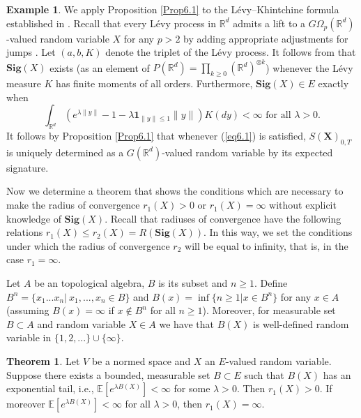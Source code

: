 \documentclass[12pt,a4paper]{report}
\theoremstyle{definition}
\newtheorem{theorem}{Theorem}
\newtheorem{example}{Example}
\begin{document}
\begin{example}\parencite[see][Example 6.2]{chevyrev2016characteristic}
	We apply Proposition \ref{Prop6.1} to the Lévy–Khintchine formula established	in \parencite{friz2017general}. Recall that every Lévy process in $\mathbb{R}^d$ admits a lift to a $G\Omega_p(\mathbb{R}^d)$-valued random variable $X$ for any $p > 2$ by adding appropriate adjustments for jumps \parencite[see][Section 2]{williams2001path}. Let $(a, b, K)$ denote the triplet of the Lévy process.	
	It follows from \parencite[Section 9.1]{friz2017general} that $\textbf{Sig}(X)$ exists (as an element of $P(\mathbb{R}^d)=\prod_{k\geq 0}(\mathbb{R}^d)^{\otimes k}$) whenever the Lévy measure $K$ has finite moments of all orders. Furthermore, $\textbf{Sig}(X) \in E$ exactly when
	\begin{equation}\label{eq6.1}
		 \int_{\mathbb{R}^d}(e^{\lambda \|y\|}-1-\lambda \textbf{1}_{\|y\|\leq 1}\|y\|) K(dy)<\infty \text{ for all } \lambda >0.
	\end{equation}
It follows by Proposition \ref{Prop6.1} that whenever (\ref{eq6.1}) is satisfied, $S(\textbf{X})_{0,T}$ is uniquely determined as a $G(\mathbb{R}^d)$-valued random variable by its expected signature.
\end{example}

Now we determine a theorem that shows the conditions which are necessary to make the radius of convergence $r_1(X)>0$ or $r_1(X)=\infty$ without explicit knowledge of $\textbf{Sig}(X)$. Recall that radiuses of convergence have the following relations $r_1(X) \leq r_2(X)= R(\textbf{Sig}(X))$. In this way, we set the conditions under which the radius of convergence $r_2$ will be equal to infinity, that is, in the case $r_1=\infty$.

Let $A$ be an topological algebra, $B$ is its subset  and $n\geq 1$. Define $B^n=\{x_1...x_n| \: x_1,...,x_n \in B\}$ and $B(x)=\inf{\{n\geq 1 | x\in B^n\}}$ for any $x\in A$ (assuming $B(x)=\infty $ if $x\notin B^n$ for all $n\geq 1$). Moreover, for measurable set $B\subset A$ and random variable $X\in A$ we have that $B(X)$ is well-defined random variable in $\{1,2,...\}\cup\{\infty\}$.

 
\begin{theorem}\parencite[see][]{chevyrev2016characteristic}\label{Thm5}
	Let $V$ be a normed space and $X$ an $E$-valued random variable. Suppose there exists a bounded, measurable set $B \subset E$ such that $B(X)$ has an exponential tail, i.e., $\mathbb{E} [e^{\lambda B(X)}] < \infty $ for some $\lambda > 0$. Then $r_1(X) > 0$. If moreover $\mathbb{E} [e^{\lambda B(X)}]< \infty $ for all $\lambda > 0$, then $r_1(X) = \infty$. 
\end{theorem}
\end{document}

